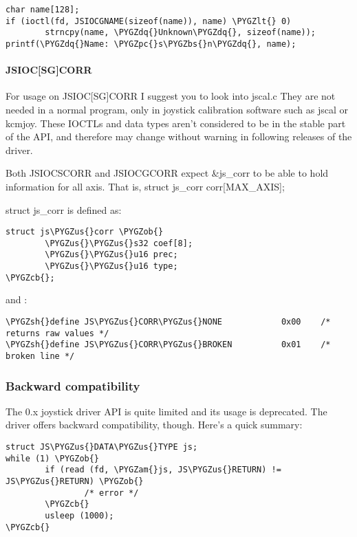 \documentclass[a4paper,8pt,english]{sphinxmanual}
\def\PYGZbs{\char`\\}
\def\PYGZus{\char`\_}
\def\PYGZob{\char`\{}
\def\PYGZcb{\char`\}}
\def\PYGZam{\char`\&}
\def\PYGZlt{\char`\<}
\def\PYGZsh{\char`\#}
\def\PYGZpc{\char`\%}
\def\PYGZdq{\char`\"}
\begin{document}
\begin{Verbatim}[commandchars=\\\{\}]
char name[128];
if (ioctl(fd, JSIOCGNAME(sizeof(name)), name) \PYGZlt{} 0)
        strncpy(name, \PYGZdq{}Unknown\PYGZdq{}, sizeof(name));
printf(\PYGZdq{}Name: \PYGZpc{}s\PYGZbs{}n\PYGZdq{}, name);
\end{Verbatim}


\paragraph{JSIOC{[}SG{]}CORR}
\label{input/joydev/joystick-api:jsioc-sg-corr}
For usage on JSIOC{[}SG{]}CORR I suggest you to look into jscal.c  They are
not needed in a normal program, only in joystick calibration software
such as jscal or kcmjoy. These IOCTLs and data types aren't considered
to be in the stable part of the API, and therefore may change without
warning in following releases of the driver.

Both JSIOCSCORR and JSIOCGCORR expect \&js\_corr to be able to hold
information for all axis. That is, struct js\_corr corr{[}MAX\_AXIS{]};

struct js\_corr is defined as:

\begin{Verbatim}[commandchars=\\\{\}]
struct js\PYGZus{}corr \PYGZob{}
        \PYGZus{}\PYGZus{}s32 coef[8];
        \PYGZus{}\PYGZus{}u16 prec;
        \PYGZus{}\PYGZus{}u16 type;
\PYGZcb{};
\end{Verbatim}

and :

\begin{Verbatim}[commandchars=\\\{\}]
\PYGZsh{}define JS\PYGZus{}CORR\PYGZus{}NONE            0x00    /* returns raw values */
\PYGZsh{}define JS\PYGZus{}CORR\PYGZus{}BROKEN          0x01    /* broken line */
\end{Verbatim}


\subsubsection{Backward compatibility}
\label{input/joydev/joystick-api:backward-compatibility}
The 0.x joystick driver API is quite limited and its usage is deprecated.
The driver offers backward compatibility, though. Here's a quick summary:

\begin{Verbatim}[commandchars=\\\{\}]
struct JS\PYGZus{}DATA\PYGZus{}TYPE js;
while (1) \PYGZob{}
        if (read (fd, \PYGZam{}js, JS\PYGZus{}RETURN) != JS\PYGZus{}RETURN) \PYGZob{}
                /* error */
        \PYGZcb{}
        usleep (1000);
\PYGZcb{}
\end{Verbatim}
\end{document}
